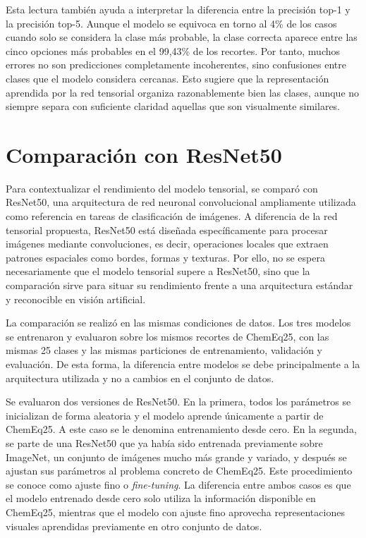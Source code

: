 Esta lectura también ayuda a interpretar la diferencia entre la precisión top-1 y la precisión top-5. Aunque el modelo se equivoca en torno al 4\% de los casos cuando solo se considera la clase más probable, la clase correcta aparece entre las cinco opciones más probables en el 99,43\% de los recortes. Por tanto, muchos errores no son predicciones completamente incoherentes, sino confusiones entre clases que el modelo considera cercanas. Esto sugiere que la representación aprendida por la red tensorial organiza razonablemente bien las clases, aunque no siempre separa con suficiente claridad aquellas que son visualmente similares.

\section{Comparación con ResNet50}

Para contextualizar el rendimiento del modelo tensorial, se comparó con ResNet50, una arquitectura de red neuronal convolucional ampliamente utilizada como referencia en tareas de clasificación de imágenes. A diferencia de la red tensorial propuesta, ResNet50 está diseñada específicamente para procesar imágenes mediante convoluciones, es decir, operaciones locales que extraen patrones espaciales como bordes, formas y texturas. Por ello, no se espera necesariamente que el modelo tensorial supere a ResNet50, sino que la comparación sirve para situar su rendimiento frente a una arquitectura estándar y reconocible en visión artificial.

La comparación se realizó en las mismas condiciones de datos. Los tres modelos se entrenaron y evaluaron sobre los mismos recortes de ChemEq25, con las mismas 25 clases y las mismas particiones de entrenamiento, validación y evaluación. De esta forma, la diferencia entre modelos se debe principalmente a la arquitectura utilizada y no a cambios en el conjunto de datos.

Se evaluaron dos versiones de ResNet50. En la primera, todos los parámetros se inicializan de forma aleatoria y el modelo aprende únicamente a partir de ChemEq25. A este caso se le denomina entrenamiento desde cero. En la segunda, se parte de una ResNet50 que ya había sido entrenada previamente sobre ImageNet, un conjunto de imágenes mucho más grande y variado, y después se ajustan sus parámetros al problema concreto de ChemEq25. Este procedimiento se conoce como ajuste fino o \textit{fine-tuning}. La diferencia entre ambos casos es que el modelo entrenado desde cero solo utiliza la información disponible en ChemEq25, mientras que el modelo con ajuste fino aprovecha representaciones visuales aprendidas previamente en otro conjunto de datos.

